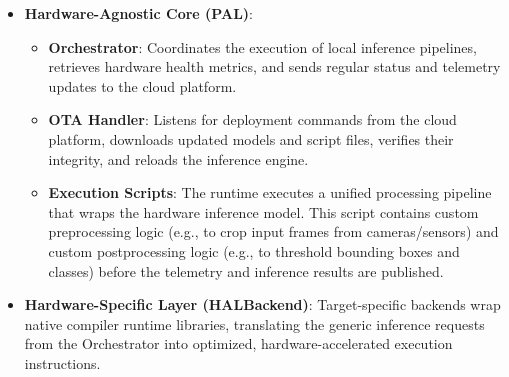 \begin{itemize}
    \item \textbf{Hardware-Agnostic Core (\gls{PAL})}:
    \begin{itemize}
        \item \textbf{Orchestrator}: Coordinates the execution of local inference pipelines, retrieves hardware health metrics, and sends regular status and telemetry updates to the cloud platform.
        \item \textbf{\gls{OTA} Handler}: Listens for deployment commands from the cloud platform, downloads updated models and script files, verifies their integrity, and reloads the inference engine.
        \item \textbf{Execution Scripts}: The runtime executes a unified processing pipeline that wraps the hardware inference model. This script contains custom preprocessing logic (e.g., to crop input frames from cameras/sensors) and custom postprocessing logic (e.g., to threshold bounding boxes and classes) before the telemetry and inference results are published.
    \end{itemize}

    \item \textbf{Hardware-Specific Layer (\acrshort{HAL}Backend)}: Target-specific backends wrap native compiler runtime libraries, translating the generic inference requests from the Orchestrator into optimized, hardware-accelerated execution instructions.
\end{itemize}